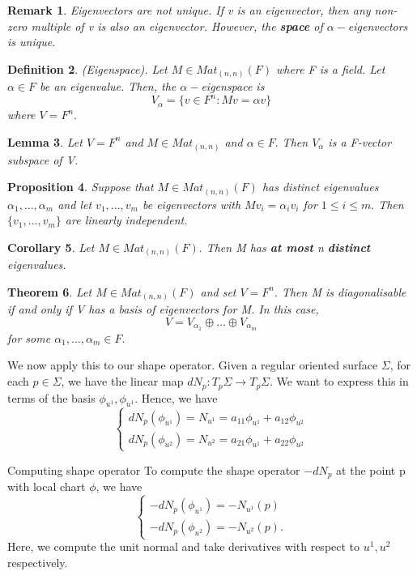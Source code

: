 \documentclass[twoside]{article}
\newcounter{lecnum}
\newtheorem{theorem}{Theorem}[lecnum]
\newtheorem{lemma}[theorem]{Lemma}
\newtheorem{proposition}[theorem]{Proposition}
\newtheorem{corollary}[theorem]{Corollary}
\newtheorem{definition}[theorem]{Definition}
\newtheorem{remark}[theorem]{Remark}
\begin{document}
\begin{remark}Eigenvectors are not unique. If v is an eigenvector, then any non-zero multiple of v is also an eigenvector. However, the \textbf{space} of $\alpha-$eigenvectors is unique.
\end{remark}

\begin{definition}(Eigenspace). Let $M \in Mat_{(n,n)}(F)$ where F is a field. Let $\alpha \in F$ be an eigenvalue. Then, the $\alpha-$eigenspace is 
$$
V_{\alpha} = \{v \in F^n: Mv = \alpha v\}
$$
where $V = F^n.$
\end{definition}

\begin{lemma}Let $V = F^n$ and $M \in Mat_{(n,n)}$ and $\alpha \in F.$ Then $V_{\alpha}$ is a F-vector subspace of V.
\end{lemma}

\begin{proposition}Suppose that $M \in Mat_{(n,n)}(F)$ has distinct eigenvalues $\alpha_1,...,\alpha_m$ and let $v_1,...,v_m$ be eigenvectors with $Mv_i = \alpha_iv_i$ for $1 \leq i \leq m.$ Then $\{v_1,...,v_m\}$ are linearly independent.
\end{proposition}
\begin{corollary}Let $M \in Mat_{(n,n)}(F).$ Then M has \textbf{at most} n \textbf{distinct} eigenvalues.
\end{corollary}

\begin{theorem}Let $M \in Mat_{(n,n)}(F)$ and set $V = F^n.$ Then M is diagonalisable if and only if V has a basis of eigenvectors for M. In this case, 
$$
V = V_{\alpha_{1}} \oplus ... \oplus V_{\alpha_{m}}
$$
for some $\alpha_1,...,\alpha_m \in F.$
\end{theorem}

We now apply this to our shape operator. Given a regular oriented surface $\Sigma$, for each $p \in \Sigma$, we have the linear map $dN_p: T_p\Sigma \rightarrow T_p\Sigma.$ We want to express this in terms of the basis $\phi_{u^{1}}, \phi_{u^{1}}.$ Hence, we have 
$$
\begin{cases}
dN_p(\phi_{u^1}) = N_{u^1} = a_{11}\phi_{u^1} + a_{12}\phi_{u^2}\\
dN_p(\phi_{u^2}) = N_{u^2} = a_{21}\phi_{u^1} + a_{22}\phi_{u^2}
\end{cases}
$$

\begin{proposition_exam}{Computing shape operator}{}
To compute the shape operator $-dN_p$ at the point p with local chart $\phi$, we have 
$$
\begin{cases}
-dN_p(\phi_{u^{1}}) = -N_{u^1}(p) \\
-dN_p(\phi_{u^{2}}) = -N_{u^2}(p).
\end{cases}
$$
Here, we compute the unit normal and take derivatives with respect to $u^1, u^2$ respectively.
\end{proposition_exam}
\end{document}
